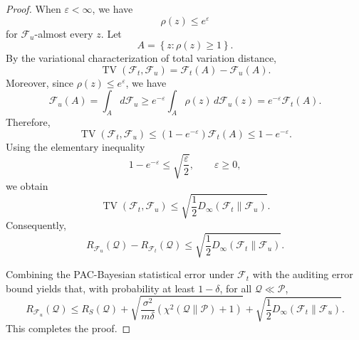 \documentclass{article}
\theoremstyle{plain}
\theoremstyle{definition}
\theoremstyle{remark}
\begin{document}
\begin{proof}
When $\varepsilon<\infty$, we have
\begin{equation}
\rho(z)
\le
e^\varepsilon
\end{equation}
for $\mathcal F_u$-almost every $z$. Let
\begin{equation}
A
=
\left\{
z:
\rho(z)\ge 1
\right\}.
\end{equation}
By the variational characterization of total variation distance,
\begin{equation}
\operatorname{TV}(\mathcal F_t,\mathcal F_u)
=
\mathcal F_t(A)-\mathcal F_u(A).
\end{equation}
Moreover, since $\rho(z)\le e^\varepsilon$, we have
\begin{equation}
\mathcal F_u(A)
=
\int_A d\mathcal F_u
\ge
e^{-\varepsilon}
\int_A \rho(z)\,d\mathcal F_u(z)
=
e^{-\varepsilon}\mathcal F_t(A).
\end{equation}
Therefore,
\begin{equation}
\operatorname{TV}(\mathcal F_t,\mathcal F_u)
\le
\left(1-e^{-\varepsilon}\right)\mathcal F_t(A)
\le
1-e^{-\varepsilon}.
\end{equation}
Using the elementary inequality
\begin{equation}
1-e^{-\varepsilon}
\le
\sqrt{\frac{\varepsilon}{2}},
\qquad
\varepsilon\ge 0,
\end{equation}
we obtain
\begin{equation}
\operatorname{TV}(\mathcal F_t,\mathcal F_u)
\le
\sqrt{
\frac{1}{2}
D_\infty(\mathcal F_t\|\mathcal F_u)
}.
\end{equation}
Consequently,
\begin{equation}
R_{\mathcal F_u}(\mathcal Q)-R_{\mathcal F_t}(\mathcal Q)
\le
\sqrt{
\frac{1}{2}
D_\infty(\mathcal F_t\|\mathcal F_u)
}.
\end{equation}

Combining the PAC-Bayesian statistical error under $\mathcal F_t$ with the auditing error bound yields that, with probability at least $1-\delta$, for all $\mathcal Q\ll\mathcal P$,
\begin{equation}
R_{\mathcal F_u}(\mathcal Q)
\le
R_S(\mathcal Q)
+
\sqrt{
\frac{\sigma^2}{m\delta}
\left(
\chi^2(\mathcal Q\|\mathcal P)+1
\right)
}
+
\sqrt{
\frac{1}{2}
D_\infty(\mathcal F_t\|\mathcal F_u)
}.
\end{equation}
This completes the proof.
\end{proof}
\end{document}
